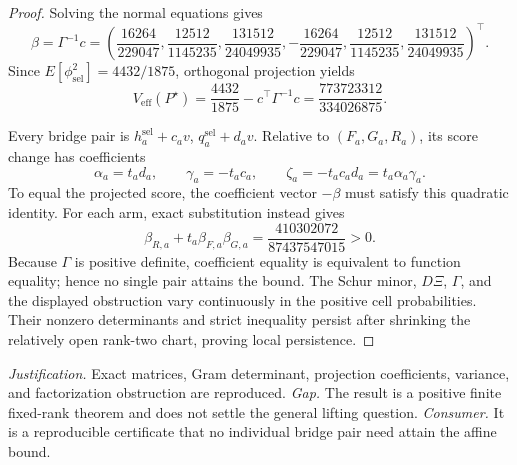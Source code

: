\documentclass{article}
\begin{document}
\begin{proof}
Solving the normal equations gives
\[
\beta=\Gamma^{-1}c=\left(
\frac{16264}{229047},\frac{12512}{1145235},\frac{131512}{24049935},
-\frac{16264}{229047},\frac{12512}{1145235},\frac{131512}{24049935}
\right)^\top.
\]
Since \(E[\phi_{\mathrm{sel}}^2]=4432/1875\), orthogonal projection yields
\[
V_{\mathrm{eff}}(P^\star)
=\frac{4432}{1875}-c^\top\Gamma^{-1}c
=\frac{773723312}{334026875}.
\]

Every bridge pair is \(h_a^{\mathrm{sel}}+c_av\), \(q_a^{\mathrm{sel}}+d_av\).  Relative to \((F_a,G_a,R_a)\), its score change has coefficients
\[
\alpha_a=t_ad_a,\qquad \gamma_a=-t_ac_a,
\qquad \zeta_a=-t_ac_ad_a=t_a\alpha_a\gamma_a.
\]
To equal the projected score, the coefficient vector \(-\beta\) must satisfy this quadratic identity.  For each arm, exact substitution instead gives
\[
\beta_{R,a}+t_a\beta_{F,a}\beta_{G,a}
=\frac{410302072}{87437547015}>0.
\]
Because \(\Gamma\) is positive definite, coefficient equality is equivalent to function equality; hence no single pair attains the bound.  The Schur minor, \(D\Xi\), \(\Gamma\), and the displayed obstruction vary continuously in the positive cell probabilities.  Their nonzero determinants and strict inequality persist after shrinking the relatively open rank-two chart, proving local persistence.
\end{proof}
\par\smallskip\noindent \textit{Justification.} Exact matrices, Gram determinant, projection coefficients, variance, and factorization obstruction are reproduced. \textit{Gap.} The result is a positive finite fixed-rank theorem and does not settle the general lifting question. \textit{Consumer.} It is a reproducible certificate that no individual bridge pair need attain the affine bound.
\end{document}

